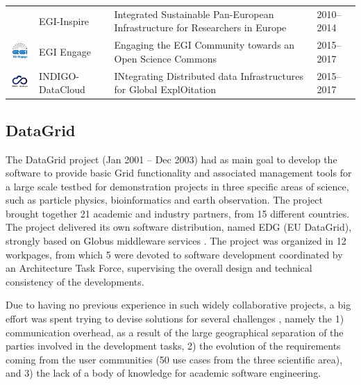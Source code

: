 \documentclass[journal]{IEEEtran}
\begin{document}
\begin{table}[!h]
\begin{tabular}{p{1.6cm}p{1.5cm}p{3cm}l}
\begin{minipage}{.3\textwidth}
\end{minipage}
     & EGI-Inspire &
Integrated Sustainable Pan-European Infrastructure for Researchers in Europe
 & 2010--2014\\
\begin{minipage}{.3\textwidth}
\includegraphics[width=15mm,height=7.5mm]{images/egi_engage}
\end{minipage}
     & EGI Engage &
Engaging the EGI Community towards an Open Science Commons
 & 2015--2017\\
\begin{minipage}{.3\textwidth}
\includegraphics[width=15mm,height=7.5mm]{images/indigo}
\end{minipage}
     & INDIGO-DataCloud &
INtegrating Distributed data Infrastructures for Global ExplOitation
 & 2015--2017\\
\hline
\hline
\end{tabular}
\end{table}

\subsection{DataGrid}

The DataGrid \cite{cordis:datagrid} project (Jan 2001 -- Dec 2003) 
had as main goal to develop the software to provide basic Grid functionality
and associated management tools for a large scale testbed for demonstration projects in three
specific areas of science, such as particle physics, bioinformatics and earth observation.
The project brought together 21 academic and industry partners, from 15 different
countries. 
The project delivered its own software distribution, named EDG (EU DataGrid), strongly 
based on Globus middleware services \cite{globus}. The project was organized in 12 workpages, from 
which 5 were devoted to software development coordinated by an 
Architecture Task Force, supervising the overall design and technical consistency 
of the developments.

Due to having no previous experience in such widely
collaborative projects, a big effort was spent trying to devise solutions for several
challenges \cite{datagrid}, namely the 1) communication overhead, as a
result of the large geographical separation of the parties involved in the
development tasks, 2) the evolution of the requirements coming from the user
communities (50 use cases from the three scientific area), and 3) the lack of a body 
of knowledge for academic software engineering.
\end{document}
